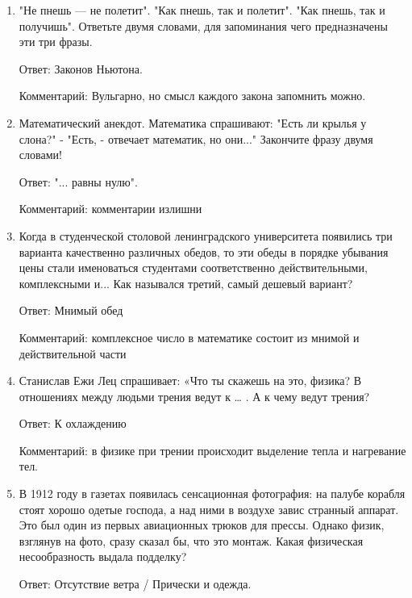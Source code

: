 \documentclass[oneside,final,14pt]{extreport}
\begin{document}
\begin{enumerate}
    Ответ: «4 сыра», «4 сезона».

    Комментарий. Обитающие на пляжах Того агамы отказались от своего привычного рациона из насекомых и прониклись горячей любовью к пицце, как и черепашки-ниндзя, но сыр их привлекает больше, чем ветчина, грибы, овощи и оливки. Итальянская фамилия учёного тоже могла вам помочь.

    \item "Не пнешь — не полетит". "Как пнешь, так и полетит". "Как пнешь, так и получишь". Ответьте двумя словами, для запоминания чего предназначены эти три фразы.

    Ответ: Законов Ньютона.

    Комментарий: Вульгарно, но смысл каждого закона запомнить можно.

    \item Математический анекдот. Математика спрашивают: "Есть ли крылья у слона?" - "Есть, - отвечает математик, но они..." Закончите фразу двумя словами!

    Ответ: "... равны нулю".

    Комментарий: комментарии излишни

    \item Когда в студенческой столовой ленинградского университета появились три варианта качественно различных обедов, то эти обеды в порядке убывания цены стали именоваться студентами соответственно действительными, комплексными и... Как назывался третий, самый дешевый вариант?

    Ответ: Мнимый обед

    Комментарий: комплексное число в математике состоит из мнимой и действительной части

    \item Станислав Ежи Лец спрашивает: «Что ты скажешь на это, физика? В отношениях между людьми трения ведут к … . А к чему ведут трения?

    Ответ: К охлаждению

    Комментарий: в физике при трении происходит выделение тепла и нагревание тел.

    \item В 1912 году в газетах появилась сенсационная фотография: на палубе корабля стоят хорошо одетые господа, а над ними в воздухе завис странный аппарат. Это был один из первых авиационных трюков для прессы. Однако физик, взглянув на фото, сразу сказал бы, что это монтаж. Какая физическая несообразность выдала подделку?

    Ответ: Отсутствие ветра / Прически и одежда.


\end{enumerate}
\end{document}
